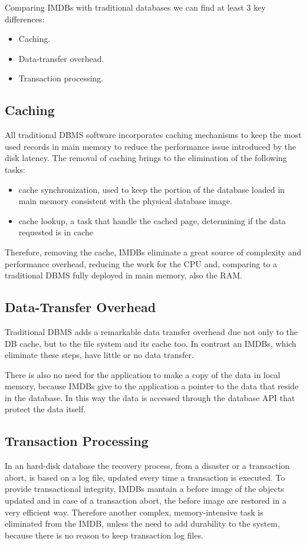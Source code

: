 		Comparing IMDBs with traditional databases we can find at least 3 key 
		differences:	

		\begin{itemize}
			\item Caching.
			\item Data-transfer overhead.
			\item Transaction processing.
		\end{itemize}
			
		\subsection{Caching}
			All traditional DBMS software incorporates caching mechanisms to keep 
			the most used records in main memory to reduce the performance issue 
			introduced by the disk latency. The removal of caching brings to 
			the elimination	of the following tasks:	
					
			\begin{itemize}
				\item cache synchronization, used to keep the portion of the database loaded
				in main memory consistent with the physical database image.
				\item cache lookup, a task that handle the cached page, determining if the
				data requested is in cache
			\end{itemize}
			
			Therefore, removing the cache, IMDBs eliminate a great source of complexity and 
			performance overhead, reducing the work for the CPU and, comparing to a traditional 
			DBMS fully deployed in main memory, also the RAM.
			
		\subsection{Data-Transfer Overhead}
			Traditional DBMS adds a remarkable data transfer overhead due 
			not only to the DB cache, but to the file system and its cache too. 
			In contrast an IMDBs, which eliminate these steps, have little or no data transfer. 
			
			There is also no need for the application to make a copy of the data in local memory, 
			because IMDBs give to the application a pointer to the data that reside in the database.
			In this way the data is accessed through the database API that protect the data itself.
			
		\subsection{Transaction Processing}
			In an hard-disk database the recovery process, from a disaster or a transaction abort, 
			is based on a log file, updated every time a transaction is executed.
			To provide transactional integrity, IMDBs mantain a before image of the objects updated and in case 
			of a transaction abort, the before image are restored in a very efficient way.
			Therefore another complex, memory-intensive task is eliminated from the IMDB, 
			unless the need to add durability to the system, because there is no reason 
			to keep transaction log files.
			
